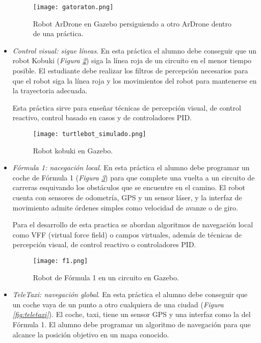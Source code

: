 \begin{itemize}
\begin{figure}[h]
	\centering\texttt{[image: gatoraton.png]}
	\caption{Robot ArDrone en Gazebo persiguiendo a otro ArDrone dentro de una práctica.}
	\label{fig:gatoraton}
\end{figure}
	
	\item \textit{Control visual: sigue líneas}. En esta práctica el alumno debe conseguir que un robot Kobuki (\textit{Figura \ref{fig:kobuki}}) siga la línea roja de un circuito en el menor tiempo posible. El estudiante debe realizar los filtros de percepción necesarios para que el robot siga la línea roja y los movimientos del robot para mantenerse en la trayectoria adecuada.
	
	Esta práctica sirve para enseñar técnicas de percepción visual, de control reactivo, control basado en casos y de controladores PID.

\begin{figure}[h]
	\centering\texttt{[image: turtlebot\_simulado.png]}
	\caption{Robot kobuki en Gazebo.}
	\label{fig:kobuki}
\end{figure}
	
	\item \textit{Fórmula 1: nacegación local}. En esta práctica el alumno debe programar un coche de Fórmula 1 (\textit{Figura \ref{fig:f1}}) para que complete una vuelta a un circuito de carreras esquivando los obstáculos que se encuentre en el camino. El robot cuenta con sensores de odometría, GPS y un sensor láser, y la interfaz de movimiento admite órdenes simples como velocidad de avanze o de giro.
	
	Para el desarrollo de esta practica se abordan algoritmos de navegación local como
	VFF (virtual force field) o campos virtuales, además de técnicas de percepción visual, de control reactivo o controladores PID.
	
\begin{figure}[h]
	\centering\texttt{[image: f1.png]}
	\caption{Robot de Fórmula 1 en un circuito en Gazebo.}
	\label{fig:f1}
\end{figure}
	
	\item \textit{TeleTaxi: navegación global}. En esta práctica el alumno debe conseguir que un coche vaya de un punto a otro cualquiera de una ciudad (\textit{Figura \ref{fig:teletaxi}}). El coche, taxi, tiene un sensor GPS y una interfaz como la del Fórmula 1. El alumno debe programar un algoritmo de navegación para que alcance la posición objetivo en un mapa conocido.
	

\end{itemize}
